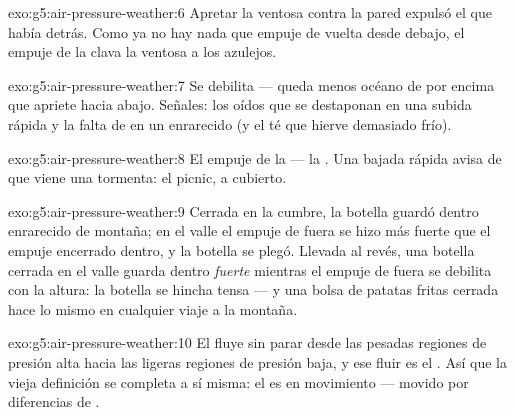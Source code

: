 \begin{solution}{exo:g5:air-pressure-weather:6}
Apretar la ventosa contra la pared expulsó el  que había
detrás. Como ya no hay nada que empuje de vuelta desde debajo, el
empuje de la  clava la ventosa a los azulejos.
\end{solution}

\begin{solution}{exo:g5:air-pressure-weather:7}
Se debilita --- queda menos océano de  por encima que apriete
hacia abajo. Señales: los oídos que se destaponan en una subida
rápida y la falta de  en un  enrarecido (y el té que hierve
demasiado frío).
\end{solution}

\begin{solution}{exo:g5:air-pressure-weather:8}
El empuje de la  --- la . Una bajada
rápida avisa de que viene una tormenta: el picnic, a cubierto.
\end{solution}

\begin{solution}{exo:g5:air-pressure-weather:9}
Cerrada en la cumbre, la botella guardó dentro  enrarecido de
montaña; en el valle el empuje de fuera se hizo más fuerte que el
empuje encerrado dentro, y la botella se plegó. Llevada al revés, una
botella cerrada en el valle guarda dentro  \emph{fuerte} mientras
el empuje de fuera se debilita con la altura: la botella se hincha
tensa --- y una bolsa de patatas fritas cerrada hace lo mismo en
cualquier viaje a la montaña.
\end{solution}

\begin{solution}{exo:g5:air-pressure-weather:10}
El  fluye sin parar desde las pesadas regiones de presión alta
hacia las ligeras regiones de presión baja, y ese fluir es el
. Así que la vieja definición se completa a sí misma: el
 es  en movimiento --- movido por diferencias de
.
\end{solution}

